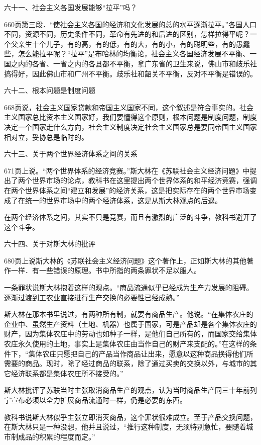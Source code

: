 六十一、社会主义各国发展能够“拉平”吗？

660页第三段．“使社会主义各国的经济和文化发展的总的水平逐渐拉平。”各国人口不同，资源不同，历史条件不同，革命有先进的和后进的区别，怎样拉得平呢？一个父亲生十个儿子，有的高，有的低，有的大，有的小，有的聪明些，有的愚蠢些，怎么能拉平呢？“拉平”是布哈林的均衡论，社会主义各国经济发展不平衡、一国之内的各省、一省之内的各县都不平衡，拿广东省的卫生来说，佛山市和歧乐社搞得好，因此佛山市和广州不平衡。歧乐社和韶关不平衡，反对不平衡是错误的。

六十二、根本问题是制度问题

668页说，社会主义国家贷款和帝国主义国家不同，这个叙述是符合事实的。社会主义国家总比资本主义国家好，我们要懂得这个原则，根本问题是制度问题，制度决定一个国家走什么方向，社会主义制度决定社会主义国家总是要同帝国主义国家相对立，妥协总是临时的。

六十三、关于两个世界经济体系之间的关系

671页上说。“两个世界体系的经济竞赛。”斯大林在《苏联社会主义经济问题》中提出了两个世界市场的论点，教科书在这里提出两个世界体系的和平经济竞赛，强调在两个世界体系之间“建立和发展”的经济关系，这是把实际存在的两个世界市场变成了在统一的世界市场中的两个经济体系，这是从斯大林观点的后退。

在两个经济体系之间，其实不只是竞赛，而且有激烈的广泛的斗争，教科书避开了这个斗争。

六十四、关于对斯大林的批评

680页上说斯大林的《苏联社会主义经济问题》这个著作上，正如斯大林的其他著作一样．有一些错误的原理。书中所指的两条罪状不足以服人。

一条罪状说斯大林抱着这样的观点。“商品流通似乎已经成为生产力发展的阻碍。逐渐过渡到工农业直接进行生产交换的必要性已经成熟。”

斯大林在那本书里说过，有两种所有制，就要有商品生产。他说。“在集体农庄的企业中、虽然生产资料（土地、机器）也属于国家，可是产品却是各个集体农庄的财产，因为集体农庄中的劳动也如种子一样，是他们自己所有的，而国家交给集体农庄永久使用的土地，事实上是集体农庄由当作自己的财产来支配的。”在这样的条件下，“集体农庄只愿把自己的产品当作商品让出来，愿意以这种商品换得他们所需要的商品。现时，除了经过商品的联系，除了通过买卖的交换以外，与城市的其它经济联系都是集体农庄所不接受的。”

斯大林批评了苏联当时主张取消商品生产的观点，认为当时商品生产同三十年前列宁宣布必须以全力扩展商品流通时一样，仍是必要的东西。

教科书说斯大林似乎主张立即消灭商品，这个罪状很难成立。至于产品交换问题，在斯大林只是一种没想，他并且说过，“推行这种制度，无须特别急忙，要随着城市制成品的积累的程度而定。”

